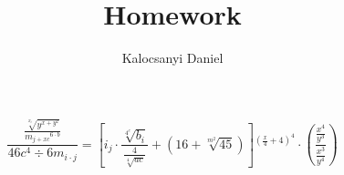 \documentclass[12pt,a4paper]{article}
\author{Kalocsanyi Daniel}
\title{Homework}
\begin{document}
\begin{center}
\begin{Large}
$$ \frac{\frac{\sqrt[x_i]{y^{x+y^2}}}{{m_{j+{x}{c}}}^{6\cdot b}}}{46{c}^{4}\div{6}{m}_{i \cdot j}} =\left[i_{j}\cdot \frac{\sqrt[4^c]{b_i}}{\frac{4}{\sqrt[4]{ac}}}+
\left(16+\sqrt[m^2]{45}\right)
\right]{^{\left(\frac{x}{4} + 4\right)^4}} \cdot \left(\frac{\frac{x^4}{y^3}}{\frac{x^3}{y^4}}\right)$$
\end{Large}
\end{center}
\end{document}
